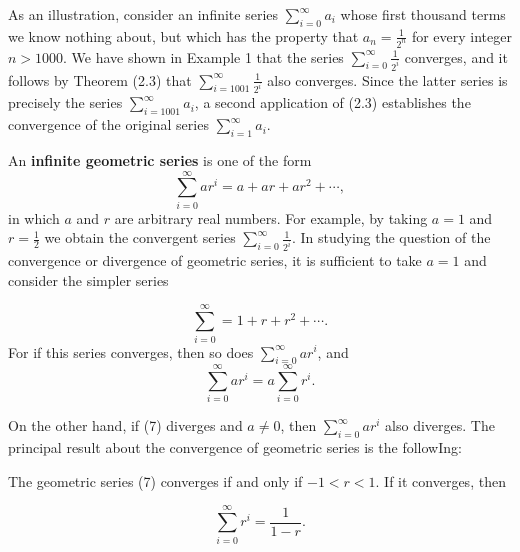 As an illustration, consider an infinite series $\sum_{i=0}^\infty a_i$ whose first thousand terms we know nothing about, but which has the property that $a_n = \frac{1}{2^n}$ for every integer $n > 1000$. We have shown in Example 1 that the series $\sum_{i=0}^\infty  \frac{1}{2^i}$ converges, and it follows by Theorem (2.3) that $\sum_{i=1001}^\infty \frac{1}{2^i}$ also converges. Since the latter series is precisely the series $\sum_{i=1001}^\infty a_i$, a second application of (2.3) establishes the convergence of the original series $\sum_{i=1}^\infty a_i$. 

An \textbf{infinite geometric series} is one of the form
$$
\sum_{i=0}^\infty ar^i = a + ar + ar^2 + \cdots ,  
$$
\noindent in which $a$ and $r$ are arbitrary real numbers. For example, by taking $a = 1$ and $r = \frac{1}{2}$ we obtain the convergent series $\sum_{i=0}^\infty \frac{1}{2^i}$. In studying the question of the convergence or divergence of geometric series, it is sufficient to take $a = 1$ and consider the simpler series


\begin{equation}
\sum_{i=0}^\infty = 1 + r + r^2 + \cdots .   
\label{eq9.2.7}
\end{equation}
\noindent For if this series converges, then so does $\sum_{i=0}^\infty ar^i$, and
$$
\sum_{i=0}^\infty ar^i = a \sum_{i=0}^\infty r^i .
$$

\noindent On the other hand, if (7) diverges and $a \neq 0$, then $\sum_{i=0}^\infty ar^i$ also diverges. The principal result about the convergence of geometric series is the followIng:

\begin{theorem} %
The geometric series (7) converges if and only if 
$ -1 < r < 1$. If it converges, then

$$
\sum_{i=0}^\infty r^i = \frac{1}{1 - r} .
$$
\end{theorem}

